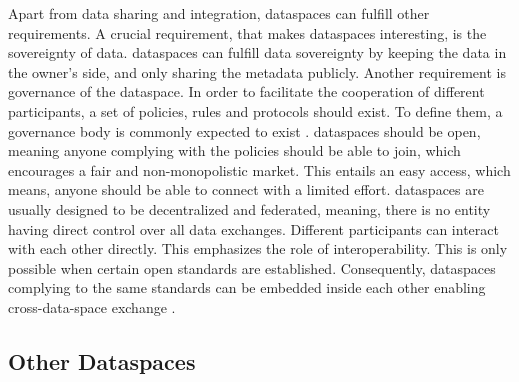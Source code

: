 Apart from data sharing and integration, dataspaces can fulfill other requirements.
A crucial requirement, that makes dataspaces interesting, is the sovereignty of data. dataspaces can fulfill data sovereignty by keeping the data in the owner's side, and only sharing the metadata publicly.
Another requirement is governance of the dataspace. In order to facilitate the cooperation of different participants, a set of policies, rules and protocols should exist. To define them, a governance body is commonly expected to exist \cite{reiberg_what_2022}.
dataspaces should be open, meaning anyone complying with the policies should be able to join, which encourages a fair and non-monopolistic market. This entails an easy access, which means, anyone should be able to connect with a limited effort.
dataspaces are usually designed to be decentralized and federated, meaning, there is no entity having direct control over all data exchanges. Different participants can interact with each other directly. This emphasizes the role of interoperability. This is only possible when certain open standards are established. Consequently, dataspaces complying to the same standards can be embedded inside each other enabling cross-data-space exchange \cite{reiberg_what_2022}.

\noindent{}
\subsection{Other Dataspaces}
\subsection{}